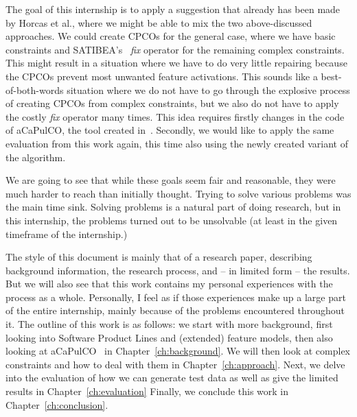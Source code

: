 The goal of this internship is to apply a suggestion that already has been made by 
Horcas et al., where we might be able to mix the two above-discussed 
approaches. We could create CPCOs for the general case, where we have basic 
constraints and SATIBEA's~\cite{henard2015satibea} \emph{fix} operator for the 
remaining complex constraints. This might result in a situation where we have 
to do very little repairing because the CPCOs prevent most unwanted feature 
activations. This sounds like a best-of-both-words situation where we do not 
have to go through the explosive process of creating CPCOs from complex 
constraints, but we also do not have to apply the costly \emph{fix} operator 
many times. This idea requires firstly changes in the code of aCaPulCO, the 
tool created in~\cite{horcas2022breakit}. Secondly, we would like to apply the
same evaluation from this work again, this time also using the newly created 
variant of the algorithm.

We are going to see that while these goals seem fair and reasonable, they were
much harder to reach than initially thought. Trying to solve various
problems was the main time sink. Solving problems is a natural part of doing
research, but in this internship, the problems turned out to be unsolvable (at
least in the given timeframe of the internship.)

The style of this document is mainly that of a research paper, describing
background information, the research process, and -- in limited form -- the
results. But we will also see that this work contains my personal experiences
with the process as a whole. Personally, I feel as if those experiences make up
a large part of the entire internship, mainly because of the problems
encountered throughout it. The outline of this work is as follows:
we start with more background, first looking into Software Product Lines and
(extended) feature models, then also looking at aCaPulCO~\cite{horcas2022breakit}
in Chapter~\ref{ch:background}.
We will then look at complex constraints and how to deal with them in
Chapter~\ref{ch:approach}. Next, we delve into the evaluation of how we can
generate test data as well as give the limited results in
Chapter~\ref{ch:evaluation} Finally, we conclude this work in 
Chapter~\ref{ch:conclusion}.